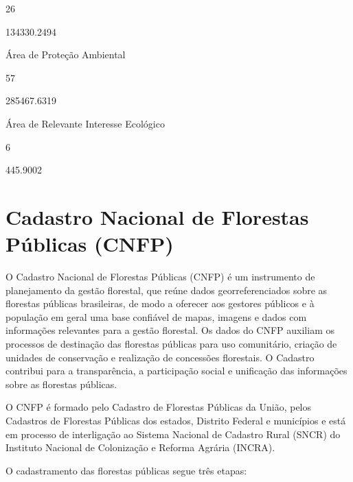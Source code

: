 \documentclass[
  letterpaper,
]{report}
\begin{document}
\n      

26

\n      

134330.2494

\n    

\n    

\n      

Área de Proteção Ambiental

\n      

57

\n      

285467.6319

\n    

\n    

\n      

Área de Relevante Interesse Ecológico

\n      

6

\n      

445.9002

\n    

\n  

\n

\hypertarget{cadastro-nacional-de-florestas-puxfablicas-cnfp}{%
\section{Cadastro Nacional de Florestas Públicas
(CNFP)}\label{cadastro-nacional-de-florestas-puxfablicas-cnfp}}

O Cadastro Nacional de Florestas Públicas (CNFP) é um instrumento de
planejamento da gestão florestal, que reúne dados georreferenciados
sobre as florestas públicas brasileiras, de modo a oferecer aos gestores
públicos e à população em geral uma base confiável de mapas, imagens e
dados com informações relevantes para a gestão florestal. Os dados do
CNFP auxiliam os processos de destinação das florestas públicas para uso
comunitário, criação de unidades de conservação e realização de
concessões florestais. O Cadastro contribui para a transparência, a
participação social e unificação das informações sobre as florestas
públicas.

O CNFP é formado pelo Cadastro de Florestas Públicas da União, pelos
Cadastros de Florestas Públicas dos estados, Distrito Federal e
municípios e está em processo de interligação ao Sistema Nacional de
Cadastro Rural (SNCR) do Instituto Nacional de Colonização e Reforma
Agrária (INCRA).

O cadastramento das florestas públicas segue três etapas:
\end{document}
